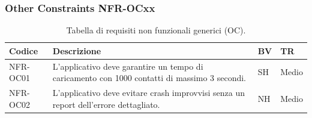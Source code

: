 \documentclass[a4paper,12pt]{article}
\begin{document}
    \subsubsection{Other Constraints NFR-OCxx}
    \begin{table}[H]
        \centering
        \begin{tabular}{|l|p{8cm}|l|l|}
            \hline
            \textbf{Codice} & \textbf{Descrizione} & \textbf{BV} & \textbf{TR} \\
            \hline
            NFR-OC01 & L'applicativo deve garantire un tempo di caricamento con 1000 contatti di massimo 3 secondi. & SH & Medio \\
            \hline
            NFR-OC02 & L'applicativo deve evitare crash improvvisi senza un report dell'errore dettagliato. & NH & Medio \\
            \hline
        \end{tabular}
        \caption{Tabella di requisiti non funzionali generici (OC).}
    \end{table}
\end{document}

